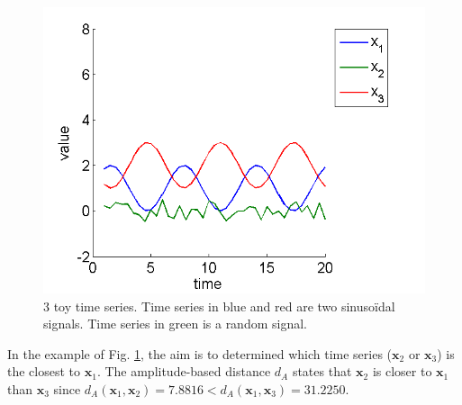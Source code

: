 \begin{figure}[h!]
\centering
\includegraphics[width=0.7\linewidth]{images/ExampleTimeSeriesMetrics3}
\caption{3 toy time series. Time series in blue and red are two sinusoïdal signals. Time series in green is a random signal.}
\label{fig:ExampleTimeSeriesMetrics3}
\end{figure}

In the example of Fig. \ref{fig:ExampleTimeSeriesMetrics3}, the aim is to determined which time series ($\textbf{x}_2$ or $\textbf{x}_3$) is the closest to $\textbf{x}_1$. The amplitude-based distance $d_A$ states that $\textbf{x}_2$ is closer to $\textbf{x}_1$ than $\textbf{x}_3$ since $d_A(\textbf{x}_1,\textbf{x}_2) = 7.8816 < d_A(\textbf{x}_1,\textbf{x}_3)= 31.2250$.



